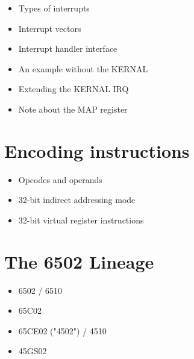 \begin{itemize}
    \item Types of interrupts
\item Interrupt vectors
\item Interrupt handler interface
\item An example without the KERNAL
\item Extending the KERNAL IRQ
\item Note about the MAP register
\end{itemize}

\section{Encoding instructions}

\begin{itemize}
    \item Opcodes and operands
\item 32-bit indirect addressing mode
\item 32-bit virtual register instructions
\end{itemize}

\section{The 6502 Lineage}

\begin{itemize}
    \item 6502 / 6510
\item 65C02
\item 65CE02 ("4502") / 4510
\item 45GS02
\end{itemize}
